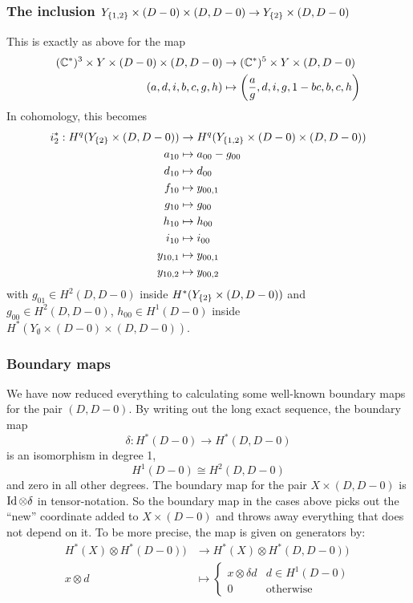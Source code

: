\subsubsection{The inclusion $Y_{\left\{ 1,2 \right\}}\times (D-0)
\times (D,D-0) \to Y_{\left\{ 2 \right\}}\times (D,D-0)$}
This is exactly as above for the map
\begin{align*}
  (\mathbb{C}^*)^3 \times Y \times (D-0)\times (D,D-0) &\to (\mathbb{C}^*)^5 \times
  Y\times (D,D-0) \\ 
  (a,d,i,b,c,g,h) &\mapsto
  \left(\frac{a}{g},d,i,g,1-bc,b,c,h\right)
\end{align*}
In cohomology, this becomes
\begin{align*}
  i_2^* : H^q(Y_{\left\{ 2 \right\}}\times (D,D-0)) &\to H^q(Y_{\left\{ 1,2 \right\}}\times
  (D-0) \times (D,D-0)) \\
  a_{10} &\mapsto a_{00} - g_{00} \\
  d_{10} &\mapsto d_{00} \\
  f_{10} &\mapsto y_{00,1}\\
  g_{10} &\mapsto g_{00} \\
  h_{10} &\mapsto h_{00} \\
  i_{10} & \mapsto i_{00} \\
  y_{10,1} &\mapsto y_{00,1} \\
  y_{10,2} &\mapsto y_{00,2}
\end{align*}
with $g_{01}\in H^2(D,D-0)$ inside $H^*(Y_{\left\{ 2 \right\}}\times (D,D-0))$ and
$g_{00}\in H^2(D,D-0)$, $h_{00}\in H^1(D-0)$ inside
$H^*(Y_{\emptyset}\times(D-0)\times(D,D-0))$.

\subsubsection{Boundary maps}
\label{disk}
We have now reduced everything to calculating some well-known boundary
maps for the pair $(D,D-0)$. By writing out the long exact sequence,
the boundary map
\[ \delta : H^*(D-0) \to H^*(D,D-0) \]
is an isomorphism in degree 1,
\[ H^1(D-0) \cong H^2(D,D-0) \]
and zero in all other degrees. The boundary map for the pair $X\times
(D,D-0)$ is $\operatorname{Id}\otimes \delta$ in tensor-notation. So the boundary
map in the cases above picks out the ``new'' coordinate added to
$X\times (D-0)$ and throws away everything that does not depend on
it. To be more precise, the map is given on generators by:
\begin{align*}
  H^*(X)\otimes H^*(D-0)) &\to H^*(X)\otimes H^*(D,D-0)) \\
  x\otimes d &\mapsto
  \begin{cases}
    x \otimes \delta d & d\in H^1(D-0) \\
    0 & \text{otherwise}
  \end{cases}
\end{align*}

